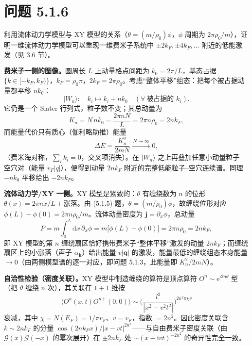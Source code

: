 \section*{问题 5.1.6}
\begin{problem}
利用流体动力学模型与 XY 模型的关系（$\theta=(m/\rho_0)\phi$，$\phi$ 周期为 $2\pi\rho_0/m$），证明一维流体动力学模型可以重现一维费米子系统中 $\pm2k_F,\pm4k_F,\dots$ 附近的低能激发（见 3.6 节）。
\end{problem}
\solution

\textbf{费米子一侧的图像。}圆周长 $L$ 上动量格点间距为 $k_0=2\pi/L$，基态占据 $\{k\in[-k_F,k_F)\}$，$k_F=\rho_0\pi$，$2k_F=2\pi\rho_0$。考虑“整体平移”组态：把每个被占据动量都平移 $nk_0$：
\begin{equation*}
|W_n\rangle:\quad k_i\mapsto k_i+nk_0\quad(\forall\ \text{被占据的 }k_i).
\end{equation*}
它仍是一个 Slater 行列式，粒子数不变；其总动量为
\begin{equation*}
K_n=N\,nk_0=\frac{2\pi nN}{L}=2\pi n\rho_0=2nk_F ,
\end{equation*}
而能量代价只有质心（伽利略助推）能量
\begin{equation*}
\Delta E=\frac{K_n^{2}}{2mN}\xrightarrow{\ N\to\infty\ }0 ,
\end{equation*}
（费米海对称，$\sum_ik_i=0$，交叉项消失）。在 $|W_n\rangle$ 之上再叠加任意小动量粒子--空穴对（能量 $v_F|q|$），便得到动量 $2nk_F$ 附近的完整低能粒子--空穴连续谱。同理 $-nk_0$ 平移给出 $-2nk_F$。

\textbf{流体动力学/XY 一侧。}XY 模型是紧致的：$\theta$ 有缠绕数为 $n$ 的位形 $\theta(x)=2\pi nx/L+\text{涨落}$。由 (5.1.5) 题，$\theta=(m/\rho_0)\phi$，故缠绕位形对应 $\phi(L)-\phi(0)=2\pi n\rho_0/m$。流体动量密度为 $\pmb{j}=\partial_x\phi$，总动量
\begin{equation*}
P=m\int_0^L\mathrm{d}x\,\partial_x\phi=m\big[\phi(L)-\phi(0)\big]=2\pi n\rho_0=2nk_F ,
\end{equation*}
即 XY 模型的第 $n$ 缠绕扇区恰好携带费米子“整体平移”激发的动量 $2nk_F$；而缠绕扇区上的小涨落（声子 $\alpha_{\pmb{k}}$）给出能量 $v|\pmb{q}|$ 的激发，能量最低的缠绕组态本身能量 $\to0$（由两侧模型谱的逐一对应，即问题 5.1.3，此能量即 $K_n^{2}/2mN$）。

\textbf{自洽性检验（密度关联）。}XY 模型中制造缠绕的算符是顶点算符 $O^{n}\sim\mathrm{e}^{\mathrm{i}2n\theta}$ 型（把 $\theta$ 缠绕 $n$ 次），其关联在 $1+1$ 维按
\begin{equation*}
\langle O^{n}(x,t)O^{n\dagger}(0,0)\rangle\sim\Big(\frac{l^{2}}{|x^{2}-v^{2}t^{2}|}\Big)^{2n^{2}\pi\chi v}
\end{equation*}
衰减，其中 $\chi=N(E_F)=1/\pi v_F$、$v=v_F$，指数 $=2n^{2}$。因此密度关联含 $k\sim2nk_F$ 的分量 $\cos(2nk_Fx)/|x-vt|^{2n^{2}}$——与自由费米子密度关联（由 $\mathcal{G}(x)\mathcal{G}(-x)$ 的幂次展开）在 $\pm2nk_F$ 处 $\sim(x-\mathrm{i}vt)^{-2n^{2}}$ 的奇异性完全一致。

